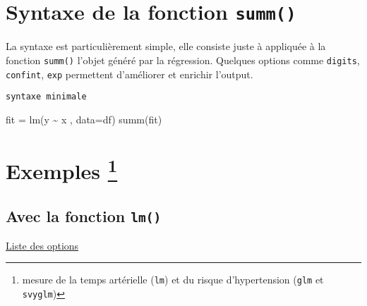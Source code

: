 \documentclass[
  letterpaper,
  DIV=11,
  numbers=noendperiod]{scrartcl}
\newenvironment{Shaded}{\begin{snugshade}}{\end{snugshade}}
\newcommand{\AttributeTok}[1]{\textcolor[rgb]{1.00,0.47,0.78}{#1}}
\newcommand{\FunctionTok}[1]{\textcolor[rgb]{0.31,0.98,0.48}{#1}}
\newcommand{\NormalTok}[1]{\textcolor[rgb]{0.97,0.97,0.95}{#1}}
\newcommand{\OtherTok}[1]{\textcolor[rgb]{0.31,0.98,0.48}{#1}}
\newcommand{\SpecialCharTok}[1]{\textcolor[rgb]{1.00,0.47,0.78}{#1}}
\begin{document}
\hypertarget{syntaxe-de-la-fonction-summ}{%
\section{\texorpdfstring{\textbf{Syntaxe de la fonction
\texttt{summ()}}}{Syntaxe de la fonction summ()}}\label{syntaxe-de-la-fonction-summ}}

La syntaxe est particulièrement simple, elle consiste juste à appliquée
à la fonction \texttt{summ()} l'objet généré par la régression. Quelques
options comme \texttt{digits}, \texttt{confint}, \texttt{exp} permettent
d'améliorer et enrichir l'output.

\begin{codelisting}

\caption{\texttt{syntaxe minimale}}

\begin{Shaded}
\begin{Highlighting}[]
\NormalTok{fit }\OtherTok{=} \FunctionTok{lm}\NormalTok{(y }\SpecialCharTok{\textasciitilde{}}\NormalTok{ x , }\AttributeTok{data=}\NormalTok{df)}
\FunctionTok{summ}\NormalTok{(fit)}
\end{Highlighting}
\end{Shaded}

\end{codelisting}

\hypertarget{exemples-1}{%
\section{\texorpdfstring{\textbf{Exemples
\footnote{mesure de la temps artérielle (\texttt{lm}) et du risque
  d'hypertension (\texttt{glm} et \texttt{svyglm})}}}{Exemples }}\label{exemples-1}}

\hypertarget{avec-la-fonction-lm}{%
\subsection{\texorpdfstring{Avec la fonction
\texttt{lm()}}{Avec la fonction lm()}}\label{avec-la-fonction-lm}}

\href{https://jtools.jacob-long.com/reference/summ.lm.html}{Liste des
options}
\end{document}
